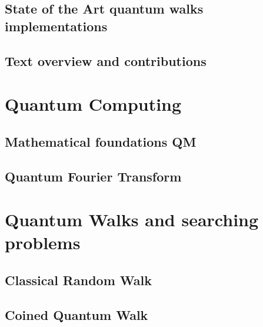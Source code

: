 \documentclass[
oneside,
11pt, a4paper,
footinclude=true,
headinclude=true,
cleardoublepage=empty
]{scrbook}
\begin{document}
\section{State of the Art quantum walks implementations}
\section{Text overview and contributions}

\chapter{Quantum Computing}
\section{Mathematical foundations QM}
\section{Quantum Fourier Transform}\label{sec:chapQFT}


\chapter{Quantum Walks and searching problems}\label{chap:chap3}
\section{Classical Random Walk}\label{sec:chap3ClassicalWalk}

\section{Coined Quantum Walk}\label{sec:chap3Coinedwalk}

\end{document}
